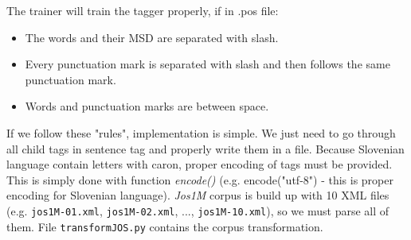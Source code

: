 \documentclass[10pt, conference, compsocconf]{IEEEtran}
\begin{document}
The trainer will train the tagger properly, if in .pos file:
\begin{itemize}
\item The words and their MSD are separated with slash.
\item Every punctuation mark is separated with slash and then follows the same punctuation mark.
\item Words and punctuation marks are between space.
\end{itemize}

If we follow these "rules", implementation is simple. We just need to go through all child tags in sentence tag and properly write them in a file. Because Slovenian language contain letters with caron, proper encoding of tags must be provided. This is simply done with function \textit{encode()} (e.g. encode("utf-8") - this is proper encoding for Slovenian language).
\textit{Jos1M} corpus is build up with 10 XML files (e.g. \texttt{jos1M-01.xml},  \texttt{jos1M-02.xml}, ..., \texttt{jos1M-10.xml}), so we must parse all of them. 
File \texttt{transformJOS.py} contains the corpus transformation.
\end{document}
